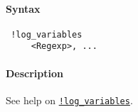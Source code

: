 


	\paragraph{Syntax}
 
 \begin{verbatim}
 !log_variables
     <Regexp>, ...
 \end{verbatim}
 
 \paragraph{Description}
 
 See help on \href{modellang/logvariables}{\texttt{!log\_variables}}.


